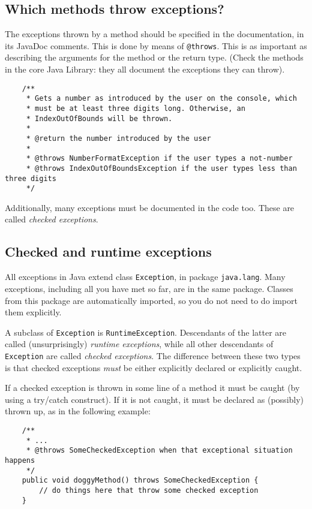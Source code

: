 \subsection{Which methods throw exceptions?}
\label{sec:which-methods-throw}

The exceptions thrown by a method should be specified in the
documentation, in its JavaDoc comments. This is done by means of
\verb+@throws+. This is as important as describing the arguments for
the method or the return type. (Check the methods in the core Java
Library: they all document the exceptions they can throw). 

\begin{verbatim}
    /**
     * Gets a number as introduced by the user on the console, which
     * must be at least three digits long. Otherwise, an 
     * IndexOutOfBounds will be thrown.
     *
     * @return the number introduced by the user
     *
     * @throws NumberFormatException if the user types a not-number
     * @throws IndexOutOfBoundsException if the user types less than three digits
     */
\end{verbatim}

Additionally, many exceptions must be documented in the code
too. These are called \emph{checked exceptions}. 

\subsection{Checked and runtime exceptions}
\label{sec:check-runt-except}

All exceptions in Java extend class \verb+Exception+, in package
\verb+java.lang+. Many exceptions, including all you have met so far,
are in the same package. Classes from this package are automatically
imported, so you do not need to do import them explicitly. 

A subclass of \verb+Exception+ is \verb+RuntimeException+. Descendants
of the latter are called (unsurprisingly) \emph{runtime exceptions},
while all other descendants of \verb+Exception+ are called
\emph{checked exceptions}. The difference between these two types is
that checked exceptions \emph{must} be either explicitly declared or
explicitly caught. 

If a checked exception is thrown in some line of a method it must be
caught (by using a try/catch construct). If it is not caught, it must
be declared as (possibly) thrown up, as in the following example:

\begin{verbatim}
    /**
     * ...
     * @throws SomeCheckedException when that exceptional situation happens
     */
    public void doggyMethod() throws SomeCheckedException {
        // do things here that throw some checked exception
    }
\end{verbatim}

